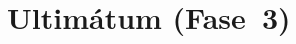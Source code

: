 \documentclass[11pt,a5paper]{book}
\begin{document}
\chapter{Ultimátum (Fase~3)}


\chapter{}
%

\chapter{}
%

\chapter{}
%

\chapter{}
%

\chapter{}
%

\chapter{}
%

\chapter{}
%

\chapter{}
%

\chapter{}
%

\begin{appendices}
\renewcommand{\thechapter}{\arabic{chapter}}
\chapter{}
\cftchapterprecistoc{}
%
\end{appendices}
\end{document}
